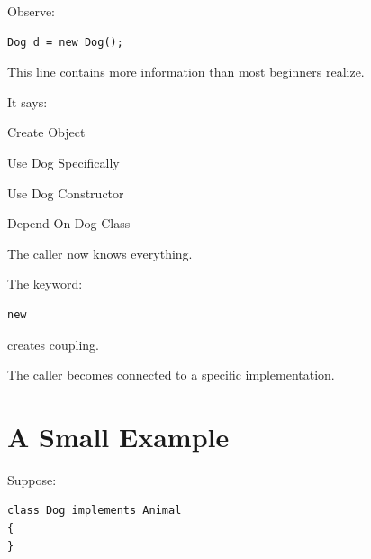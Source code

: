 \documentclass[11pt,a4paper]{book}
\begin{document}
Observe:

\begin{verbatim}
Dog d = new Dog();
\end{verbatim}


This line contains more information
than most beginners realize.


It says:


Create Object


Use Dog Specifically


Use Dog Constructor


Depend On Dog Class


The caller now knows everything.


\begin{mentalmodel}

The keyword:

\begin{verbatim}
new
\end{verbatim}

creates coupling.


The caller becomes connected
to a specific implementation.

\end{mentalmodel}


\section{A Small Example}

Suppose:

\begin{verbatim}
class Dog implements Animal
{
}
\end{verbatim}
\end{document}
